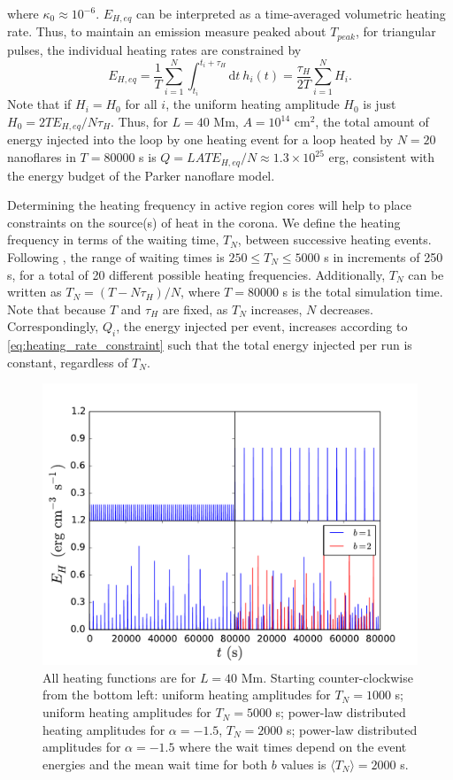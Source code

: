 \documentclass[tighten,apj]{emulateapj}
\begin{document}
	where $\kappa_0\approx10^{-6}$. $E_{H,eq}$ can be interpreted as a time-averaged volumetric heating rate. Thus, to maintain an emission measure peaked about $T_{peak}$, for triangular pulses, the individual heating rates are constrained by 
	\begin{equation}
		\label{eq:heating_rate_constraint}
		E_{H,eq} = \frac{1}{T}\sum_{i=1}^N\int_{t_i}^{t_i+\tau_H}\mathrm{d}t~h_i(t) = \frac{\tau_H}{2T}\sum_{i=1}^NH_i.
	\end{equation}
	Note that if $H_i=H_0$ for all $i$, the uniform heating amplitude $H_0$ is just $H_0=2TE_{H,eq}/N\tau_H$. Thus, for $L=40$ Mm, $A=10^{14}$ cm$^2$, the total amount of energy injected into the loop by one heating event for a loop heated by $N=20$ nanoflares in $T=80000$ s is $Q=LATE_{H,eq}/N\approx1.3\times10^{25}$ erg, consistent with the energy budget of the Parker nanoflare model. 
	\par Determining the heating frequency in active region cores will help to place constraints on the source(s) of heat in the corona. We define the heating frequency in terms of the waiting time, $T_N$, between successive heating events. Following \citet{cargill_active_2014}, the range of waiting times is $250\le T_N\le5000$ s in increments of 250 s, for a total of 20 different possible heating frequencies. Additionally, $T_N$ can be written as $T_N=(T-N\tau_H)/N$, where $T=80000$ s is the total simulation time. Note that because $T$ and $\tau_H$ are fixed, as $T_N$ increases, $N$ decreases. Correspondingly, $Q_i$, the energy injected per event, increases according to \autoref{eq:heating_rate_constraint} such that the total energy injected per run is constant, regardless of $T_N$.
	\begin{figure}
		\centering
		\includegraphics[width=\columnwidth]{figures/heating_functions.pdf}
		\caption{All heating functions are for $L=40$ Mm. Starting counter-clockwise from the bottom left: uniform heating amplitudes for $T_N=1000$ s; uniform heating amplitudes for $T_N=5000$ s; power-law distributed heating amplitudes for $\alpha=-1.5$, $T_N=2000$ s; power-law distributed amplitudes for $\alpha=-1.5$ where the wait times depend on the event energies and the mean wait time for both $b$ values is $\langle T_N\rangle=2000$ s.}
		\label{fig:heating_funcs}
	\end{figure}
\end{document}
